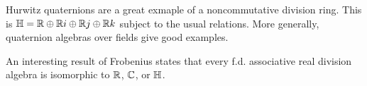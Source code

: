 \begin{example}
Hurwitz quaternions are a great exmaple of a noncommutative division ring.
This is $\mathbb{H} = \mathbb{R} \oplus \mathbb{R} i \oplus \mathbb{R} j \oplus \mathbb{R} k$ subject to the usual relations.
More generally, quaternion algebras over fields give good examples.
\end{example}

\begin{remark}
An interesting result of Frobenius states that every f.d. associative 
real division algebra is isomorphic to $\mathbb{R}$, $\mathbb{C}$, or $\mathbb{H}$.
\end{remark}